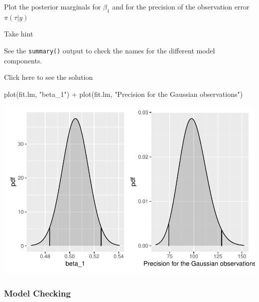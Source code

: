 \documentclass[
  letterpaper,
  DIV=11,
  numbers=noendperiod]{scrartcl}
\newenvironment{Shaded}{\begin{snugshade}}{\end{snugshade}}
\newcommand{\FunctionTok}[1]{\textcolor[rgb]{0.28,0.35,0.67}{#1}}
\newcommand{\NormalTok}[1]{\textcolor[rgb]{0.00,0.23,0.31}{#1}}
\newcommand{\SpecialCharTok}[1]{\textcolor[rgb]{0.37,0.37,0.37}{#1}}
\newcommand{\StringTok}[1]{\textcolor[rgb]{0.13,0.47,0.30}{#1}}
\begin{document}
\begin{tcolorbox}[enhanced jigsaw, title={Task}, bottomrule=.15mm, toptitle=1mm, colbacktitle=quarto-callout-warning-color!10!white, opacitybacktitle=0.6, opacityback=0, rightrule=.15mm, colframe=quarto-callout-warning-color-frame, coltitle=black, toprule=.15mm, arc=.35mm, breakable, bottomtitle=1mm, titlerule=0mm, left=2mm, leftrule=.75mm, colback=white]

Plot the posterior marginals for \(\beta_1\) and for the precision of
the observation error \(\pi(\tau|y)\)

Take hint

See the \texttt{summary()} output to check the names for the different
model components.

Click here to see the solution

\begin{Shaded}
\begin{Highlighting}[]
\FunctionTok{plot}\NormalTok{(fit.lm, }\StringTok{"beta\_1"}\NormalTok{) }\SpecialCharTok{+}
\FunctionTok{plot}\NormalTok{(fit.lm, }\StringTok{"Precision for the Gaussian observations"}\NormalTok{)}
\end{Highlighting}
\end{Shaded}

\begin{center}
\includegraphics{day1_practical_2_files/figure-pdf/unnamed-chunk-11-1.pdf}
\end{center}

\end{tcolorbox}

\subsubsection{Model Checking}\label{model-checking}
\end{document}
